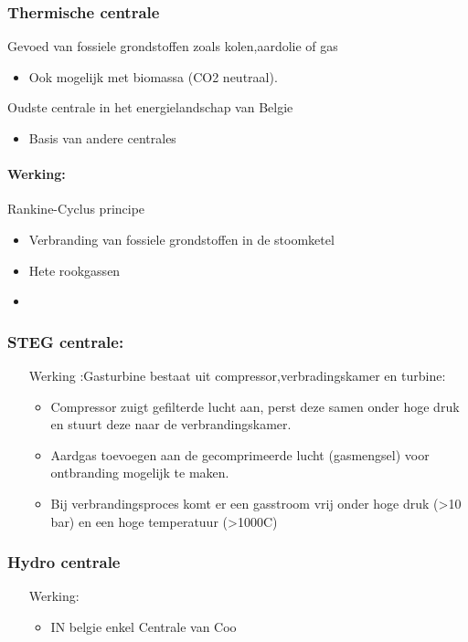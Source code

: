 \documentclass[12pt]{article}
\begin{document}
\subsubsection{Thermische centrale}
Gevoed van fossiele grondstoffen zoals kolen,aardolie of gas\begin{itemize}
    \item Ook mogelijk met biomassa (CO2 neutraal).
\end{itemize}
Oudste centrale in het energielandschap van Belgie\begin{itemize}
    \item Basis van andere centrales
\end{itemize}
\paragraph{Werking:}
Rankine-Cyclus principe\begin{itemize}
    \item Verbranding van fossiele grondstoffen in de stoomketel
    \item Hete rookgassen
    \item %
\end{itemize}
\subsubsection{STEG centrale:}
\begin{itemize}
    \item[Werking]:Gasturbine bestaat uit compressor,verbradingskamer en turbine:\begin{itemize}
        \item Compressor zuigt gefilterde lucht aan, perst deze samen onder hoge druk en stuurt deze naar de verbrandingskamer.
        \item Aardgas toevoegen aan de gecomprimeerde lucht (gasmengsel) voor ontbranding mogelijk te maken.
        \item Bij verbrandingsproces komt er een gasstroom vrij onder hoge druk (>10 bar) en een hoge temperatuur (>1000C)
    \end{itemize}
\end{itemize}
\subsubsection{Hydro centrale}
\begin{itemize}
    \item[Werking:]\begin{itemize}
        \item IN belgie enkel Centrale van Coo
    \end{itemize}
\end{itemize}
\end{document}

